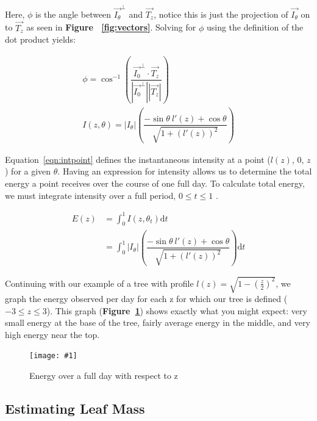 \documentclass[10pt]{article}
\numberwithin{equation}{subsection}
\newlength{\imgwidth}
\newcommand{\scalegraphics}[1]{%
    \settowidth{\imgwidth}{\texttt{[image: \#1]}}%
    \setlength{\imgwidth}{\minof{\imgwidth}{\columnwidth}}%
    \texttt{[image: \#1]}%
}
\begin{document}
Here, $\phi$ is the angle between $\vec{I_\theta}^{\perp}$ and
$\vec{T_z}$, notice this is just the projection of $\vec{I_\theta}$ on
to $\vec{T_z}$ as seen in {\bf Figure ~\ref{fig:vectors}}. Solving for $\phi$ using the definition of the dot
product yields:

\begin{center}
  \begin{gather}
    \phi = \cos^{-1} \left(\dfrac{\vec{I_0}^{\perp} \cdot \vec{T_z}}{|\vec{I_0}^{\perp}| |\vec{T_z}|}\right) \nonumber \\
    I(z,\theta) = |I_\theta|\left(\dfrac{-\sin\theta \  l'(z) + \cos\theta}{\sqrt{1+(l'(z))^2}}\right)\label{eqn:intpoint}
  \end{gather}
\end{center}

Equation~\eqref{eqn:intpoint} defines the instantaneous intensity at a
point ($l(z)$, 0, $z$) for a given $\theta$. Having an expression for
intensity allows us to determine the total energy a point receives
over the course of one full day. To calculate total energy, we must
integrate intensity over a full period, $0 \le t \le 1$ \citep{sunPower01}.

\begin{center}
  \begin{equation}
    \begin{split}
      E(z) &= \int_0^1 I(z,\theta_t) \mathrm{d}t \\
      &= \int_0^1 |I_\theta|\left(\dfrac{-\sin\theta \  l'(z) + \cos\theta}{\sqrt{1+(l'(z))^2}}\right) \mathrm{d}t
    \end{split}
  \end{equation}
\end{center}

Continuing with our example of a tree with profile $l(z) =
\sqrt{1-(\frac{z}{2})^2}$, we graph the energy observed per day for
each z for which our tree is defined ($-3 \le z \le 3$). This graph
({\bf Figure~\ref{fig:energy}}) shows exactly what you might expect:
very small energy at the base of the tree, fairly average energy in
the middle, and very high energy near the top.


\begin{figure}[h!]
  \centering
  \scalegraphics{img/energy.png}
  \caption{Energy over a full day with respect to z}
  \label{fig:energy}
\end{figure}


\subsection{Estimating Leaf Mass}
\end{document}
